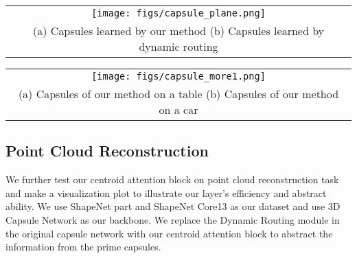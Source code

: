 \documentclass[english]{article}
\begin{document}
\begin{figure*}[ht!]
    \centering
    \begin{tabular}{c}
        \texttt{[image: figs/capsule\_plane.png]}   \\ 
        \hspace{110pt} {\small (a) Capsules learned by our method } \hspace{70pt} 
        {\small (b) Capsules learned by dynamic routing}
    \end{tabular}
    
    \caption{
    Point cloud reconstruction using 3D Capsule Network~\citep{zhao20193d} as backbone, with 12 latent capsules. We decode the 12 latent capsules one by one and highlight the corresponding decoded points with bright colors while keep the other parts gray.
(a) shows the latent capsules learned by replacing the original dynamic routing module with centroid attention blocks, which  can capture semantically meaningful parts of the plane, and are grouped into three clusters that represents plane body, plane front and back wings, and middle engine, respectively. 
    (b) shows the capsules learned by 
    dynamic routing in \citep{zhao20193d}, which distribute randomly and yield no semantic meanings.
    }
    \label{fig:cap_t}

\end{figure*}


\begin{figure*}[ht!]
    \centering
    \begin{tabular}{c}
        \texttt{[image: figs/capsule\_more1.png]}   \\
        \hspace{-40pt} {\small (a) Capsules of our method on a table} \hspace{80pt} 
         {\small (b) Capsules of our method on a car}  
\end{tabular}
    \caption{More visualization of capsules learned by our method. 
    In both (a) and (b), the capsules map to semantically meaningful parties of the inputs. 
    }\label{fig:acap_t}

\end{figure*}

\subsection{Point Cloud Reconstruction}

We further test our centroid attention block on point cloud reconstruction task and make a visualization plot to illustrate our layer's efficiency and abstract ability.
We use ShapeNet part and ShapeNet Core13 \citep{chang2015shapenet} as our dataset and use 3D Capsule Network \citep{zhao20193d} as our backbone.
We replace the Dynamic Routing module in the original capsule network with our centroid attention block to abstract the information from the prime capsules.
\end{document}
